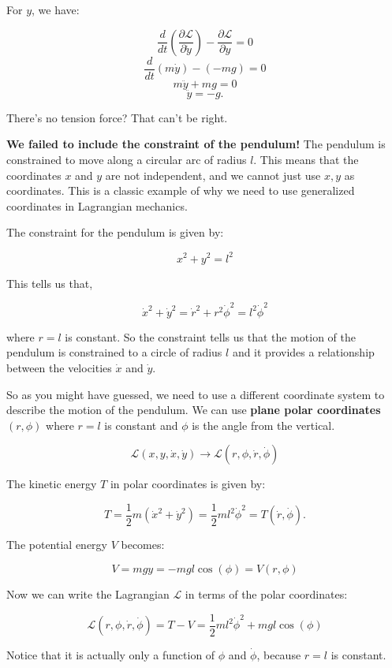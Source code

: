 \documentclass[11pt]{article}
\begin{document}
For \(y\), we have:

\[\frac{d}{dt} \left( \frac{\partial \mathcal{L}}{\partial \dot{y}} \right) - \frac{\partial \mathcal{L}}{\partial y} = 0\]
\[\frac{d}{dt} \left( m \dot{y} \right) - (-mg) = 0\]
\[m\ddot{y} + mg = 0\] \[\ddot{y} = -g.\]

There's no tension force? That can't be right.

\textbf{We failed to include the constraint of the pendulum!} The
pendulum is constrained to move along a circular arc of radius \(l\).
This means that the coordinates \(x\) and \(y\) are not independent, and
we cannot just use \(x,y\) as coordinates. This is a classic example of
why we need to use generalized coordinates in Lagrangian mechanics.

The constraint for the pendulum is given by:

\[x^2 + y^2 = l^2\]

This tells us that,

\[\dot{x}^2 + \dot{y}^2 = \dot{r}^2 + r^2 \dot{\phi}^2 = l^2 \dot{\phi}^2\]

where \(r=l\) is constant. So the constraint tells us that the motion of
the pendulum is constrained to a circle of radius \(l\) and it provides
a relationship between the velocities \(\dot{x}\) and \(\dot{y}\).

So as you might have guessed, we need to use a different coordinate
system to describe the motion of the pendulum. We can use \textbf{plane
polar coordinates} \((r, \phi)\) where \(r=l\) is constant and \(\phi\)
is the angle from the vertical.

\[\mathcal{L}(x, y, \dot{x}, \dot{y}) \rightarrow \mathcal{L}(r, \phi, \dot{r}, \dot{\phi})\]

The kinetic energy \(T\) in polar coordinates is given by:

\[T = \frac{1}{2} m \left( \dot{x}^2 + \dot{y}^2 \right) = \frac{1}{2} ml^2\dot{\phi}^2 = T(\dot{r}, \dot{\phi}).\]

The potential energy \(V\) becomes:

\[V = mgy = - mg l \cos(\phi) = V(r, \phi)\]

Now we can write the Lagrangian \(\mathcal{L}\) in terms of the polar
coordinates:

\[
\mathcal{L}(r, \phi, \dot{r}, \dot{\phi}) = T - V = \frac{1}{2} m l^2 \dot{\phi}^2 + mgl \cos(\phi)
\]

Notice that it is actually only a function of \(\phi\) and
\(\dot{\phi}\), because \(r=l\) is constant.
\end{document}
